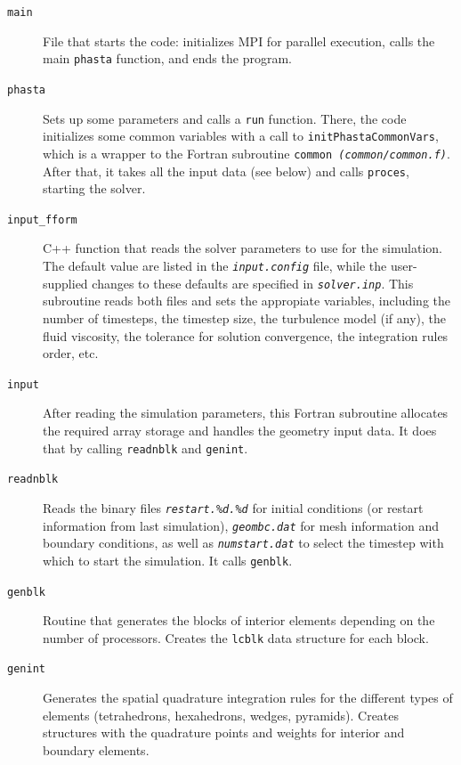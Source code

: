 \documentclass{ucb}
\begin{document}
\begin{description}

    \item[\texttt{main}] File that starts the code: initializes MPI for parallel execution, calls the main \texttt{phasta} function, and ends the program.
    
    \item[\texttt{phasta}] Sets up some parameters and calls a \texttt{run} function. There, the code initializes some common variables with a call to \texttt{initPhastaCommonVars}, which is a wrapper to the Fortran subroutine \texttt{common \textit{(common/common.f)}}. After that, it takes all the input data (see below) and calls \texttt{proces}, starting the solver.
    
    \item[\texttt{input\_fform}] C++ function that reads the solver parameters to use for the simulation. The default value are listed in the \texttt{\textit{input.config}} file, while the user-supplied changes to these defaults are specified in \texttt{\textit{solver.inp}}. This subroutine reads both files and sets the appropiate variables, including the number of timesteps, the timestep size, the turbulence model (if any), the fluid viscosity, the tolerance for solution convergence, the integration rules order, etc.
    
    \item[\texttt{input}] After reading the simulation parameters, this Fortran subroutine allocates the required array storage and handles the geometry input data. It does that by calling \texttt{readnblk} and \texttt{genint}.
    
    \item[\texttt{readnblk}] Reads the binary files \texttt{\textit{restart.\%d.\%d}} for initial conditions (or restart information from last simulation), \texttt{\textit{geombc.dat}} for mesh information and boundary conditions, as well as \texttt{\textit{numstart.dat}} to select the timestep with which to start the simulation. It calls \texttt{genblk}.
    
    \item[\texttt{genblk}] Routine that generates the blocks of interior elements depending on the number of processors. Creates the \texttt{lcblk} data structure for each block.
    
    \item[\texttt{genint}] Generates the spatial quadrature integration rules for the different types of elements (tetrahedrons, hexahedrons, wedges, pyramids). Creates structures with the quadrature points and weights for interior and boundary elements.
    
\end{description}
\end{document}
